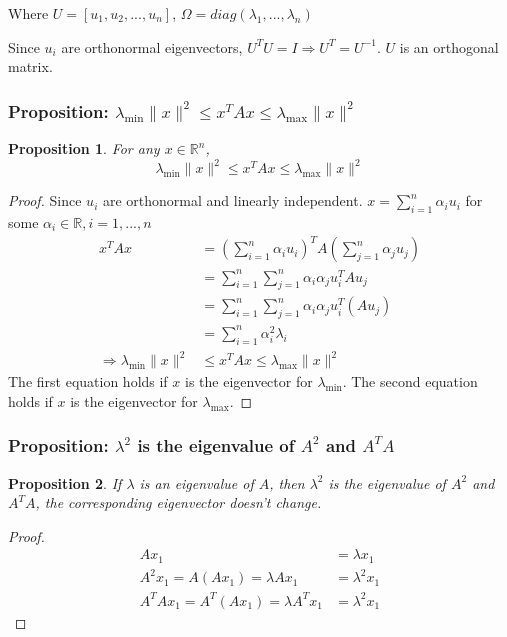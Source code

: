 \documentclass[11pt,a4paper]{article}
\newtheorem{proposition}{Proposition}
\begin{document}
Where $U=[u_1,u_2,...,u_n]$, $\Omega=diag(\lambda_1,...,\lambda_n)$

Since $u_i$ are orthonormal eigenvectors, $U^TU=I \Rightarrow U^T=U^{-1}$. $U$ is an orthogonal matrix.

\subsubsection{Proposition: $\lambda_{\min}\|x\|^2\leq x^TAx\leq \lambda_{\max}\|x\|^2$}
\begin{proposition}
For any $x\in \mathbb{R}^n$, $$\lambda_{\min}\|x\|^2\leq x^TAx\leq \lambda_{\max}\|x\|^2$$
\end{proposition}
\begin{proof}
    Since $u_i$ are orthonormal and linearly independent. $x=\sum_{i=1}^n\alpha_i u_i$ for some $\alpha_i\in \mathbb{R},i=1,...,n$
    \begin{equation}
        \begin{aligned}
            x^TAx&=(\sum_{i=1}^n\alpha_i u_i)^TA(\sum_{j=1}^n\alpha_j u_j)\\
            &=\sum_{i=1}^n\sum_{j=1}^n\alpha_i \alpha_ju_i^TAu_j\\
            &=\sum_{i=1}^n\sum_{j=1}^n\alpha_i \alpha_ju_i^T(Au_j)\\
            &=\sum_{i=1}^n\alpha_i^2\lambda_i\\
            \Rightarrow	\lambda_{\min}\|x\|^2&\leq x^TAx\leq \lambda_{\max}\|x\|^2
        \end{aligned}
        \nonumber
    \end{equation}
    The first equation holds if $x$ is the eigenvector for $\lambda_{\min}$. The second equation holds if $x$ is the eigenvector for $\lambda_{\max}$.
\end{proof}

\subsubsection{Proposition: $\lambda^2$ is the eigenvalue of $A^2$ and $A^TA$}
\begin{proposition}
If $\lambda$ is an eigenvalue of $A$, then $\lambda^2$ is the eigenvalue of $A^2$ and $ A^TA$, the corresponding eigenvector doesn't change.
\end{proposition}
\begin{proof}
\begin{equation}
    \begin{aligned}
        Ax_1&=\lambda x_1\\
        A^2x_1=A(Ax_1)=\lambda Ax_1&=\lambda^2 x_1\\
        A^TAx_1=A^T(Ax_1)=\lambda A^Tx_1&=\lambda^2x_1
    \end{aligned}
    \nonumber
\end{equation}
\end{proof}
\end{document}
